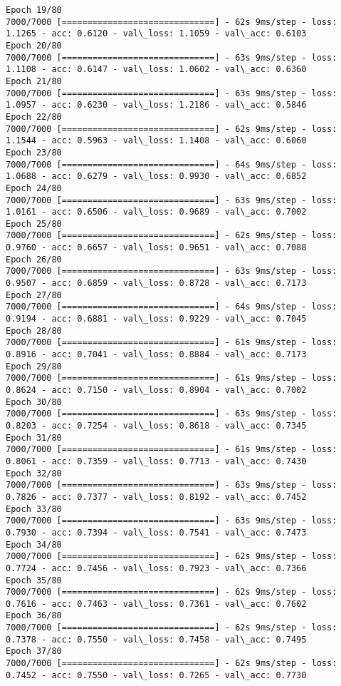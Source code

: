 \documentclass[11pt]{article}
\begin{document}
\begin{Verbatim}[commandchars=\\\{\}]
Epoch 19/80
7000/7000 [==============================] - 62s 9ms/step - loss: 1.1265 - acc: 0.6120 - val\_loss: 1.1059 - val\_acc: 0.6103
Epoch 20/80
7000/7000 [==============================] - 63s 9ms/step - loss: 1.1108 - acc: 0.6147 - val\_loss: 1.0602 - val\_acc: 0.6360
Epoch 21/80
7000/7000 [==============================] - 63s 9ms/step - loss: 1.0957 - acc: 0.6230 - val\_loss: 1.2186 - val\_acc: 0.5846
Epoch 22/80
7000/7000 [==============================] - 62s 9ms/step - loss: 1.1544 - acc: 0.5963 - val\_loss: 1.1408 - val\_acc: 0.6060
Epoch 23/80
7000/7000 [==============================] - 64s 9ms/step - loss: 1.0688 - acc: 0.6279 - val\_loss: 0.9930 - val\_acc: 0.6852
Epoch 24/80
7000/7000 [==============================] - 63s 9ms/step - loss: 1.0161 - acc: 0.6506 - val\_loss: 0.9689 - val\_acc: 0.7002
Epoch 25/80
7000/7000 [==============================] - 62s 9ms/step - loss: 0.9760 - acc: 0.6657 - val\_loss: 0.9651 - val\_acc: 0.7088
Epoch 26/80
7000/7000 [==============================] - 63s 9ms/step - loss: 0.9507 - acc: 0.6859 - val\_loss: 0.8728 - val\_acc: 0.7173
Epoch 27/80
7000/7000 [==============================] - 64s 9ms/step - loss: 0.9194 - acc: 0.6881 - val\_loss: 0.9229 - val\_acc: 0.7045
Epoch 28/80
7000/7000 [==============================] - 61s 9ms/step - loss: 0.8916 - acc: 0.7041 - val\_loss: 0.8884 - val\_acc: 0.7173
Epoch 29/80
7000/7000 [==============================] - 61s 9ms/step - loss: 0.8624 - acc: 0.7150 - val\_loss: 0.8904 - val\_acc: 0.7002
Epoch 30/80
7000/7000 [==============================] - 63s 9ms/step - loss: 0.8203 - acc: 0.7254 - val\_loss: 0.8618 - val\_acc: 0.7345
Epoch 31/80
7000/7000 [==============================] - 61s 9ms/step - loss: 0.8061 - acc: 0.7359 - val\_loss: 0.7713 - val\_acc: 0.7430
Epoch 32/80
7000/7000 [==============================] - 63s 9ms/step - loss: 0.7826 - acc: 0.7377 - val\_loss: 0.8192 - val\_acc: 0.7452
Epoch 33/80
7000/7000 [==============================] - 63s 9ms/step - loss: 0.7930 - acc: 0.7394 - val\_loss: 0.7541 - val\_acc: 0.7473
Epoch 34/80
7000/7000 [==============================] - 62s 9ms/step - loss: 0.7724 - acc: 0.7456 - val\_loss: 0.7923 - val\_acc: 0.7366
Epoch 35/80
7000/7000 [==============================] - 62s 9ms/step - loss: 0.7616 - acc: 0.7463 - val\_loss: 0.7361 - val\_acc: 0.7602
Epoch 36/80
7000/7000 [==============================] - 62s 9ms/step - loss: 0.7378 - acc: 0.7550 - val\_loss: 0.7458 - val\_acc: 0.7495
Epoch 37/80
7000/7000 [==============================] - 62s 9ms/step - loss: 0.7452 - acc: 0.7550 - val\_loss: 0.7265 - val\_acc: 0.7730

\end{Verbatim}
\end{document}
